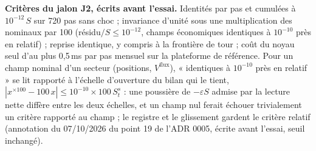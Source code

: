 \documentclass[11pt,a4paper]{article}
\begin{document}
\textbf{Critères du jalon J2, écrits avant l'essai.} Identités par pas et cumulées à $10^{-12}\,S$ sur 720 pas sans choc ; invariance d'unité sous une multiplication des nominaux par 100 (résidu$/S \le 10^{-12}$, champs économiques identiques à $10^{-10}$ près en relatif) ; reprise identique, y compris à la frontière de tour ; coût du noyau seul d'au plus 0,5\,ms par pas mensuel sur la plateforme de référence. Pour un champ nominal d'un secteur (positions, $V^{\mathrm{flux}}$), « identiques à $10^{-10}$ près en relatif » se lit rapporté à l'échelle d'ouverture du bilan qui le tient, $|x^{\times 100} - 100\,x| \le 10^{-10} \times 100\,S^s_t$ : une poussière de $-\varepsilon S$ admise par la lecture nette diffère entre les deux échelles, et un champ nul ferait échouer trivialement un critère rapporté au champ ; le registre et le glissement gardent le critère relatif (annotation du 07/10/2026 du point 19 de l'ADR 0005, écrite avant l'essai, seuil inchangé).
\end{document}
